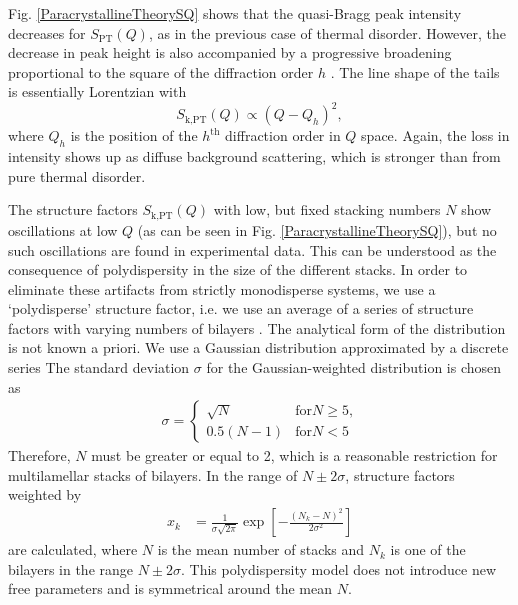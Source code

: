 Fig. \ref{ParacrystallineTheorySQ} shows that the quasi-Bragg peak
intensity decreases for $S_\text{PT}(Q)$, as in the previous case of
thermal disorder. However, the decrease in peak height is also
accompanied by a progressive broadening proportional to the square
of the diffraction order $h$ \cite{Schwartz1975}. The line shape of
the tails is essentially Lorentzian with
$$S_\text{k,PT}(Q) \propto (Q - Q_h)^2,$$
where $Q_h$ is the position of the $h^\text{th}$ diffraction order
in $Q$ space. Again, the loss in intensity shows up as diffuse
background scattering, which is stronger than from pure thermal
disorder.


The structure factors $S_\text{k,PT}(Q)$ with low, but fixed
stacking numbers $N$ show oscillations at low $Q$ (as can be seen in
Fig. \ref{ParacrystallineTheorySQ}), but no such oscillations are
found in experimental data. This can be understood as the
consequence of polydispersity in the size of the different stacks.
In order to eliminate these artifacts from strictly monodisperse
systems, we use a `polydisperse' structure factor, i.e. we use an
average of a series of structure factors with varying numbers of
bilayers \cite{Fruhwirth2004}. The analytical form of the
distribution is not known a priori. We use a Gaussian distribution
approximated by a discrete series The standard deviation $\sigma$
for the Gaussian-weighted distribution is chosen as
\begin{align}
\sigma =
\begin{cases}
\sqrt{N} & \text{for} N\geq 5 \text{,} \\
0.5(N-1) & \text{for} N< 5
\end{cases}
\end{align}
Therefore, $N$ must be greater or equal to 2, which is a
reasonable restriction for multilamellar stacks of bilayers. In
the range of $N \pm 2\sigma$, structure factors weighted by
\begin{align}
x_k & = \frac{1}{\sigma\sqrt{2\pi}} \exp\left[
-\frac{(N_k-N)^2}{2\sigma^2}\right]
\end{align}
are calculated, where $N$ is the mean number of stacks and $N_k$
is one of the  bilayers in the range $N\pm 2\sigma$. This
polydispersity model does not introduce new free parameters and is
symmetrical around the mean $N$.


